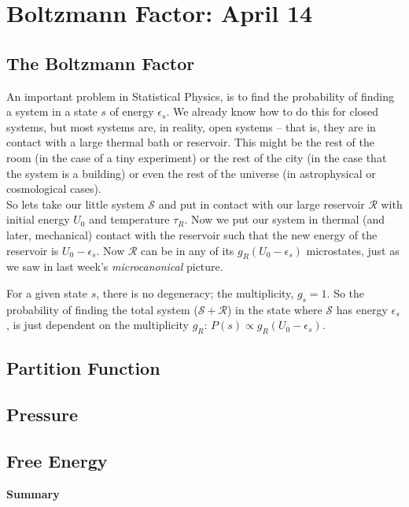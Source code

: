 \section{Boltzmann Factor: April 14}


\subsection{The Boltzmann Factor}
An important problem in Statistical Physics, is to find the probability
of finding a system in a state $s$ of energy $\epsilon_s$. We already
know how to do this for closed systems, but most systems are, in reality, open systems -- that is, they are in contact with a large thermal bath or reservoir. This might be the rest of the room (in the case of a tiny experiment) or the rest of the city (in the case that the system is a building) or even the rest of the universe (in astrophysical or cosmological cases). \\

So lets take our little system $\mathcal{S}$ and put in contact with our large reservoir $\mathcal{R}$ with initial energy $U_0$ and temperature $\tau_R$. Now we put our system in thermal (and later, mechanical) contact with the reservoir such that the new energy of the reservoir is $U_0 - \epsilon_s$. Now 
$\mathcal{R}$ can be in any of its $g_R(U_0 - \epsilon_s)$ microstates, just as we saw in last week's \textit{microcanonical} picture.

For a given state $s$, there is no degeneracy; the multiplicity, $g_s = 1$. So the probability of finding the total system ($\mathcal{S} + \mathcal{R}$) in the state where $\mathcal{S}$ has energy $\epsilon_s$, is just dependent on the multiplicity $g_R$: $P(s) \propto g_R(U_0 - \epsilon_s)$.

\subsection{Partition Function}

\subsection{Pressure}

\subsection{Free Energy}


\textbf{Summary}


